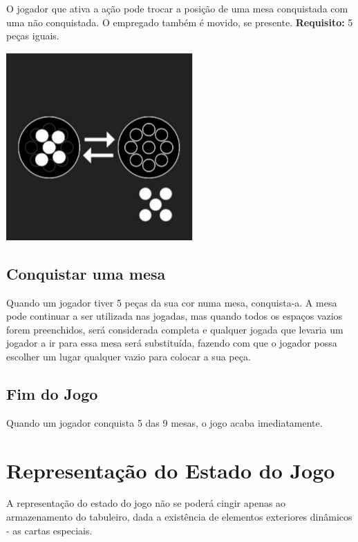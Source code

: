 \documentclass[a4paper]{article}
\begin{document}
\begin{itemize}
\begin{minipage}{0.58\textwidth}
\item O jogador que ativa a ação pode trocar a posição de uma mesa conquistada com uma não conquistada. O empregado também é movido, se presente. \newline 
\textbf{Requisito:} 5 peças iguais.
\end{minipage}
\hspace{4mm}
\begin{minipage}{0.58\textwidth}
\includegraphics[scale=0.2]{swap-claimed.png}
\end{minipage}

\end{itemize}

\subsection{Conquistar uma mesa}
Quando um jogador tiver 5 peças da sua cor numa mesa, conquista-a. A mesa pode continuar a ser utilizada nas jogadas, mas quando todos os espaços vazios forem preenchidos, será considerada completa e qualquer jogada que levaria um jogador a ir para essa mesa será substituída, fazendo com que o jogador possa escolher um lugar qualquer vazio para colocar a sua peça.

\subsection{Fim do Jogo}
Quando um jogador conquista 5 das 9 mesas, o jogo acaba imediatamente.

\newpage
\section{Representação do Estado do Jogo}
A representação do estado do jogo não se poderá cingir apenas ao armazenamento do tabuleiro, dada a existência de elementos exteriores dinâmicos - as cartas especiais.
\end{document}
